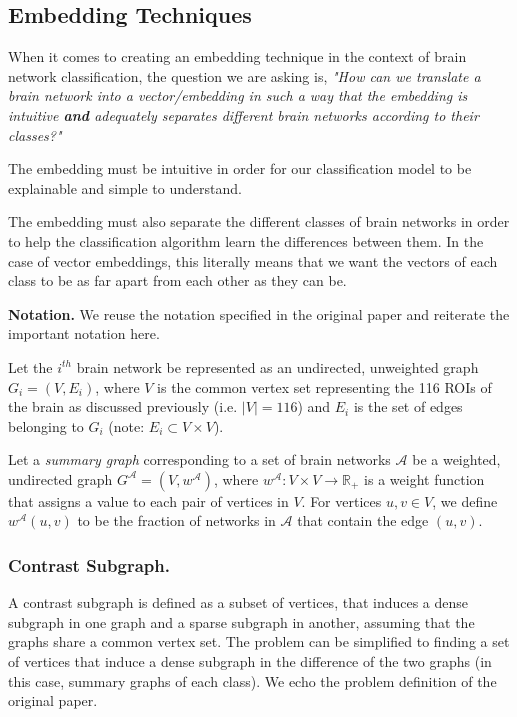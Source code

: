 \documentclass[sigconf]{acmart}
\begin{document}
\subsection{Embedding Techniques} \label{emb-technique}
When it comes to creating an embedding technique in the context of brain network classification, the question we are asking is, \emph{"How can we translate a brain network into a vector/embedding in such a way that the embedding is intuitive \textbf{and} adequately separates different brain networks according to their classes?"}

The embedding must be intuitive in order for our classification model to be explainable and simple to understand.

The embedding must also separate the different classes of brain networks in order to help the classification algorithm learn the differences between them.
In the case of vector embeddings, this literally means that we want the vectors of each class to be as far apart from each other as they can be.

\textbf{Notation.}
We reuse the notation specified in the original paper and reiterate the important notation here.

Let the $i^{th}$ brain network be represented as an undirected, unweighted graph $G_i = (V, E_i)$, where $V$ is the common vertex set representing the 116 ROIs of the brain as discussed previously (i.e. $|V| = 116$) and $E_i$ is the set of edges belonging to $G_i$ (note: $E_i \subset V \times V$).

Let a \emph{summary graph} corresponding to a set of brain networks $\mathcal{A}$ be a weighted, undirected graph $G^{\mathcal{A}} = (V, w^{\mathcal{A}})$, where $w^{\mathcal{A}}: V \times V \rightarrow \mathbb{R}_+$ is a weight function that assigns a value to each pair of vertices in $V$.
For vertices $u,v \in V$, we define $w^{\mathcal{A}}(u,v)$ to be the fraction of networks in $\mathcal{A}$ that contain the edge $(u,v)$.


\subsubsection{Contrast Subgraph.}
A contrast subgraph is defined as a subset of vertices, that induces a dense subgraph in one graph and a sparse subgraph in another, assuming that the graphs share a common vertex set.
The problem can be simplified to finding a set of vertices that induce a dense subgraph in the difference of the two graphs (in this case, summary graphs of each class).
We echo the problem definition of the original paper.
\end{document}
